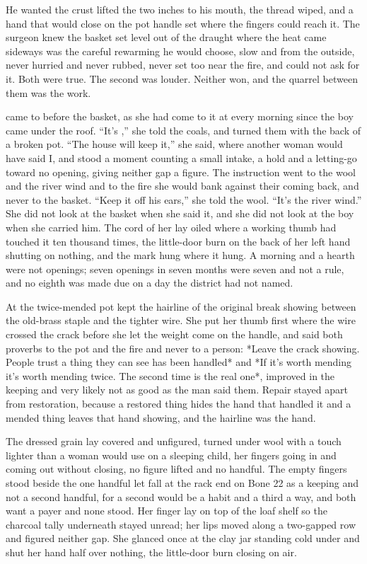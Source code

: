 \scenebreak

He wanted the crust lifted the two inches to his mouth, the thread wiped, and a hand that would close on the pot handle set where the fingers could reach it. The surgeon knew the basket set level out of the draught where the heat came sideways was the careful rewarming he would choose, slow and from the outside, never hurried and never rubbed, never set too near the fire, and could not ask for it. Both were true. The second was louder. Neither won, and the quarrel between them was the work.

 came to  before the basket, as she had come to it at every morning since the boy came under the roof. “It's ,” she told the coals, and turned them with the back of a broken pot. “The house will keep it,” she said, where another woman would have said I, and stood a moment counting a small intake, a hold and a letting-go toward no opening, giving neither gap a figure. The instruction went to the wool and the river wind and to the fire she would bank against their coming back, and never to the basket. “Keep it off his ears,” she told the wool. “It's the river wind.” She did not look at the basket when she said it, and she did not look at the boy when she carried him. The cord of her  lay oiled where a working thumb had touched it ten thousand times, the little-door burn on the back of her left hand shutting on nothing, and the mark hung where it hung. A morning and a hearth were not openings; seven openings in seven months were seven and not a rule, and no eighth was made due on a day the district had not named.

At  the twice-mended pot kept the hairline of the original break showing between the old-brass staple and the tighter wire. She put her thumb first where the wire crossed the crack before she let the weight come on the handle, and said both proverbs to the pot and the fire and never to a person: *Leave the crack showing. People trust a thing they can see has been handled* and *If it's worth mending it's worth mending twice. The second time is the real one*, improved in the keeping and very likely not as good as the man said them. Repair stayed apart from restoration, because a restored thing hides the hand that handled it and a mended thing leaves that hand showing, and the hairline was the hand.

The dressed grain lay covered and unfigured, turned under wool with a touch lighter than a woman would use on a sleeping child, her fingers going in and coming out without closing, no figure lifted and no handful. The empty fingers stood beside the one handful let fall at the rack end on Bone 22 as a keeping and not a second handful, for a second would be a habit and a third a way, and both want a payer and none stood. Her finger lay on top of the loaf shelf so the charcoal tally underneath stayed unread; her lips moved along a two-gapped row and figured neither gap. She glanced once at the clay jar standing cold under  and shut her hand half over nothing, the little-door burn closing on air.

